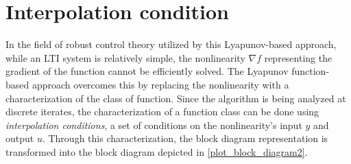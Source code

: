 
\section{Interpolation condition} \label{constraint}
In the field of robust control theory utilized by this Lyapunov-based approach, while an LTI system is relatively simple, the nonlinearity $\nabla f$ representing the gradient of the function cannot be efficiently solved. The Lyapunov function-based approach overcomes this by replacing the nonlinearity with a characterization of the class of function. Since the algorithm is being analyzed at discrete iterates, the characterization of a function class can be done using \textit{interpolation conditions}, a set of conditions on the nonlinearity's input $y$ and output $u$. Through this characterization, the block diagram representation is transformed into the block diagram depicted in \cref{plot_block_diagram2}.


